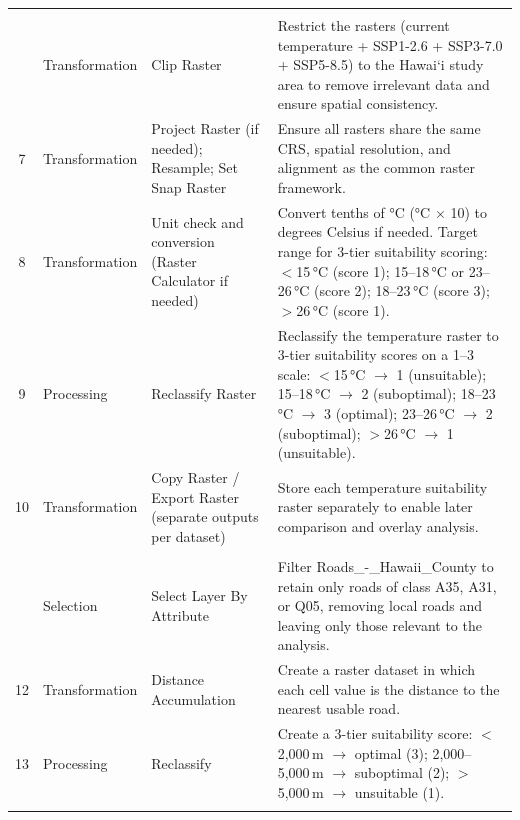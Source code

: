 \documentclass[12pt,a4paper]{article}
\newcommand{\okina}{\textquoteleft}
\begin{document}
\begin{landscape}
\begin{longtable}{@{}c >{\raggedright\arraybackslash}p{2.8cm} >{\raggedright\arraybackslash}p{6.5cm} >{\raggedright\arraybackslash}p{12.8cm}@{}}
  \addlinespace
  \multicolumn{4}{@{}l}{\textit{\textbf{Temperature} (for all three projections)}} \\
  \addlinespace
  6 & Transformation & Clip Raster & Restrict the rasters (current temperature + SSP1-2.6 + SSP3-7.0 + SSP5-8.5) to the Hawai\okina i study area to remove irrelevant data and ensure spatial consistency. \\
  7 & Transformation & Project Raster (if needed); Resample; Set Snap Raster & Ensure all rasters share the same CRS, spatial resolution, and alignment as the common raster framework. \\
  8 & Transformation & Unit check and conversion (Raster Calculator if needed) & Convert tenths of °C (°C $\times$ 10) to degrees Celsius if needed. Target range for 3-tier suitability scoring: $<$15\,°C (score 1); 15--18\,°C or 23--26\,°C (score 2); 18--23\,°C (score 3); $>$26\,°C (score 1). \\
  9 & Processing & Reclassify Raster & Reclassify the temperature raster to 3-tier suitability scores on a 1--3 scale: $<$15\,°C $\rightarrow$ 1 (unsuitable); 15--18\,°C $\rightarrow$ 2 (suboptimal); 18--23\,°C $\rightarrow$ 3 (optimal); 23--26\,°C $\rightarrow$ 2 (suboptimal); $>$26\,°C $\rightarrow$ 1 (unsuitable). \\
  10 & Transformation & Copy Raster / Export Raster (separate outputs per dataset) & Store each temperature suitability raster separately to enable later comparison and overlay analysis. \\
  \addlinespace
  \multicolumn{4}{@{}l}{\textit{\textbf{Roads}}} \\
  \addlinespace
  11 & Selection & Select Layer By Attribute & Filter Roads\_-\_Hawaii\_County to retain only roads of class A35, A31, or Q05, removing local roads and leaving only those relevant to the analysis. \\
  12 & Transformation & Distance Accumulation & Create a raster dataset in which each cell value is the distance to the nearest usable road. \\
  13 & Processing & Reclassify & Create a 3-tier suitability score: $<$2{,}000\,m $\rightarrow$ optimal (3); 2{,}000--5{,}000\,m $\rightarrow$ suboptimal (2); $>$5{,}000\,m $\rightarrow$ unsuitable (1). \\
  \addlinespace

\end{longtable}
\end{landscape}
\end{document}
